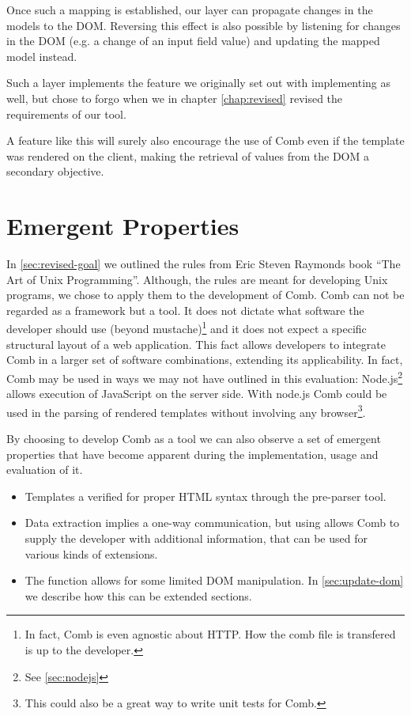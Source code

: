 \documentclass[thesis.tex]{subfiles}
\begin{document}
Once such a mapping is established, our layer can propagate changes in the
models to the DOM. Reversing this effect is also possible by listening for
changes in the DOM (e.g. a change of an input field value) and updating the
mapped model instead.

Such a layer implements the feature we originally set out with implementing as
well, but chose to forgo when we in chapter \ref{chap:revised} revised the
requirements of our tool.

A feature like this will surely also encourage the use of Comb even if the
template was rendered on the client, making the retrieval of values from the DOM
a secondary objective.



\section{Emergent Properties}
\label{sec:emergent}
In \ref{sec:revised-goal} we outlined the rules from Eric Steven Raymonds book
``The Art of Unix Programming''. Although, the rules are meant for developing
Unix programs, we chose to apply them to the development of Comb.
Comb can not be regarded as a framework but a tool. It does not dictate what
software the developer should use (beyond mustache)\footnote{
	In fact, Comb is even agnostic about HTTP. How the comb file is transfered
	is up to the developer.
} and it does not expect a specific structural layout of a web application.
This fact allows developers to integrate Comb in a larger set of software
combinations, extending its applicability.
In fact, Comb may be used in ways we may not have outlined in this evaluation:
Node.js\footnote{See \ref{sec:nodejs}} allows execution of JavaScript on the
server side. With node.js Comb could be used in the parsing of rendered
templates without involving any browser\footnote{
	This could also be a great way to write unit tests for Comb.
}.

By choosing to develop Comb as a tool we can also observe a set of emergent
properties that have become apparent during the implementation, usage and
evaluation of it.

\begin{itemize}
\item Templates a verified for proper HTML syntax through the pre-parser tool.
\item Data extraction implies a one-way communication, but using
       allows Comb to supply the developer with additional
      information, that can be used for various kinds of extensions.
\item The  function allows for some limited DOM manipulation.
      In \ref{sec:update-dom} we describe how this can be extended sections.
\end{itemize}
\end{document}
